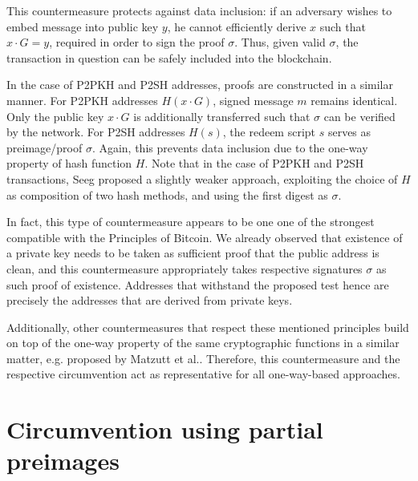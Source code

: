 \documentclass[a4paper,11pt,titlepage]{scrbook}
\begin{document}
This countermeasure protects against data inclusion: if an adversary wishes to embed message into public key $y$, he cannot efficiently derive $x$ such that $x\cdot G = y$, required in order to sign the proof $\sigma$.
Thus, given valid $\sigma$, the transaction in question can be safely included into the blockchain.

In the case of P2PKH and P2SH addresses, proofs are constructed in a similar manner.
For P2PKH addresses $H(x\cdot G)$, signed message $m$ remains identical.
Only the public key $x\cdot G$ is additionally transferred such that $\sigma$ can be verified by the network.
For P2SH addresses $H(s)$, the redeem script $s$ serves as preimage/proof $\sigma$.
Again, this prevents data inclusion due to the one-way property of hash function $H$.
Note that in the case of P2PKH and P2SH transactions, Seeg proposed a slightly weaker approach, exploiting the choice of $H$ as composition of two hash methods, and using the first digest as $\sigma$.

In fact, this type of countermeasure appears to be one one of the strongest compatible with the Principles of Bitcoin.
We already observed that existence of a private key needs to be taken as sufficient proof that the public address is clean,
and this countermeasure appropriately takes respective signatures $\sigma$ as such proof of existence.
Addresses that withstand the proposed test hence are precisely the addresses that are derived from private keys.

Additionally, other countermeasures that respect these mentioned principles build on top of the one-way property of the same cryptographic functions in a similar matter, e.g.\@ {} proposed by Matzutt et al.\@ \cite[Sec.~IV.D]{matzutt_thwarting_2018}.
Therefore, this countermeasure and the respective circumvention act as representative for all one-way-based approaches.

\section{Circumvention using partial preimages}

\end{document}
